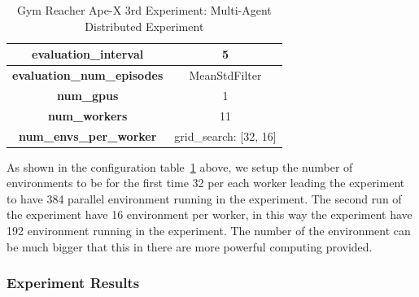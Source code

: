 \begin{table}[!htb]
\begin{tabular}{|c|l|l|c|l|l|}
    \multicolumn{3}{|c|}{\textbf{evaluation\_interval}}                          & \multicolumn{3}{c|}{5}                                             \\ \hline
    \multicolumn{3}{|c|}{\textbf{evaluation\_num\_episodes}}                  & \multicolumn{3}{c|}{MeanStdFilter}                                                  \\ \hline
    \multicolumn{3}{|c|}{\cellcolor[HTML]{C0C0C0}\textbf{num\_gpus}}    & \multicolumn{3}{c|}{\cellcolor[HTML]{C0C0C0}1}                                      \\ \hline
    \multicolumn{3}{|c|}{\cellcolor[HTML]{C0C0C0}\textbf{num\_workers}} & \multicolumn{3}{c|}{\cellcolor[HTML]{C0C0C0}11}                                      \\ \hline
    \multicolumn{3}{|c|}{\cellcolor[HTML]{C0C0C0}\textbf{num\_envs\_per\_worker}} & \multicolumn{3}{c|}{\cellcolor[HTML]{C0C0C0}grid\_search: [32, 16]}                                      \\ \hline
    \end{tabular}
    \caption{Gym Reacher Ape-X 3rd Experiment: Multi-Agent Distributed Experiment}
    \label{tab:gym_reacher_apex_3rd_exp}
\end{table}

As shown in the configuration table~\ref{tab:gym_reacher_apex_3rd_exp} above, we setup the number of environments to be for the first time 32 per each worker leading the experiment to have 384 parallel environment running in the experiment. The second run of the experiment have 16 environment per worker, in this way the experiment have 192 environment running in the experiment. The number of the environment can be much bigger that this in there are more powerful computing provided.


\subsubsection{Experiment Results}


